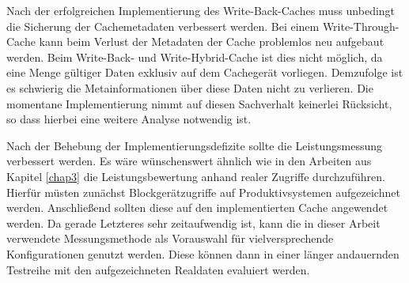 Nach der erfolgreichen Implementierung des Write-Back-Caches muss unbedingt die Sicherung der Cachemetadaten verbessert werden. Bei einem Write-Through-Cache
kann beim Verlust der Metadaten der Cache problemlos neu aufgebaut werden. Beim Write-Back- und Write-Hybrid-Cache ist dies nicht möglich, da eine Menge
gültiger Daten exklusiv auf dem Cachegerät vorliegen. Demzufolge ist es schwierig die Metainformationen über diese Daten nicht zu verlieren. Die momentane
Implementierung nimmt auf diesen Sachverhalt keinerlei Rücksicht, so dass hierbei eine weitere Analyse notwendig ist.

Nach der Behebung der Implementierungsdefizite sollte die Leistungsmessung verbessert werden. Es wäre wünschenswert ähnlich wie in den Arbeiten aus Kapitel
\ref{chap3} die Leistungsbewertung anhand realer Zugriffe durchzuführen. Hierfür müsten zunächst Blockgerätzugriffe auf Produktivsystemen aufgezeichnet werden.
Anschließend sollten diese auf den implementierten Cache angewendet werden. Da gerade Letzteres sehr zeitaufwendig ist, kann die in dieser Arbeit verwendete
Messungsmethode als Vorauswahl für vielversprechende Konfigurationen genutzt werden. Diese können dann in einer länger andauernden Testreihe mit den
aufgezeichneten Realdaten evaluiert werden.
